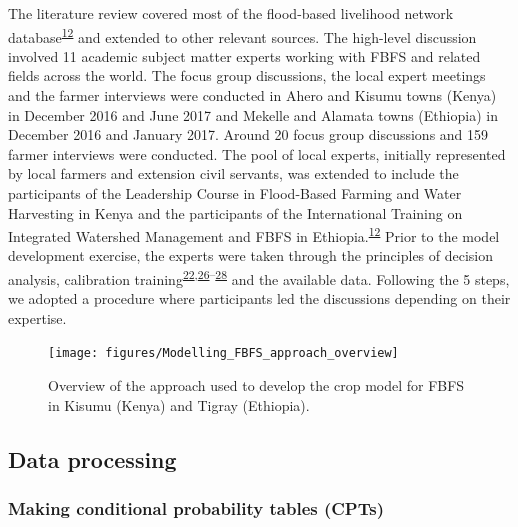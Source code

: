 \documentclass[12pt,oneside]{article}
\begin{document}
The literature review covered most of the flood-based livelihood network
database\textsuperscript{\protect\hyperlink{ref-FBLN_2018}{12}} and
extended to other relevant sources. The high-level discussion involved
11 academic subject matter experts working with FBFS and related fields
across the world. The focus group discussions, the local expert meetings
and the farmer interviews were conducted in Ahero and Kisumu towns
(Kenya) in December 2016 and June 2017 and Mekelle and Alamata towns
(Ethiopia) in December 2016 and January 2017. Around 20 focus group
discussions and 159 farmer interviews were conducted. The pool of local
experts, initially represented by local farmers and extension civil
servants, was extended to include the participants of the Leadership
Course in Flood-Based Farming and Water Harvesting in Kenya and the
participants of the International Training on Integrated Watershed
Management and FBFS in
Ethiopia.\textsuperscript{\protect\hyperlink{ref-FBLN_2018}{12}} Prior
to the model development exercise, the experts were taken through the
principles of decision analysis, calibration
training\textsuperscript{\protect\hyperlink{ref-Hubbard_2014}{22},\protect\hyperlink{ref-Luedeling_et_al_2015}{26}--\protect\hyperlink{ref-Whitney_et_al_2018a}{28}}
and the available data. Following the 5 steps, we adopted a procedure
where participants led the discussions depending on their expertise.

\begin{figure}
\texttt{[image: figures/Modelling\_FBFS\_approach\_overview]} \caption{\label{figures:figure_3}Overview of the approach used to develop the crop model for FBFS in Kisumu (Kenya) and Tigray (Ethiopia).}\label{fig:figure_3}
\end{figure}

\hypertarget{data-processing}{%
\subsection{Data processing}\label{data-processing}}

\hypertarget{making-conditional-probability-tables-cpts}{%
\subsubsection{Making conditional probability tables
(CPTs)}\label{making-conditional-probability-tables-cpts}}
\end{document}
